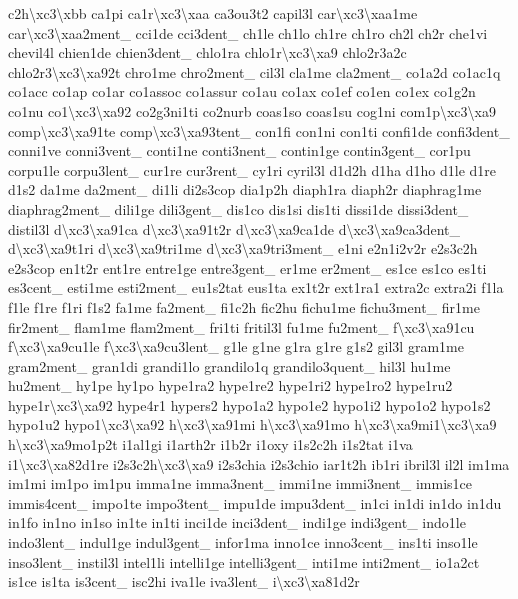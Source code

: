 \begin{DoxyCompactItemize}
c2h\textbackslash{}xc3\textbackslash{}xbb ca1pi ca1r\textbackslash{}xc3\textbackslash{}xaa ca3ou3t2 capil3l car\textbackslash{}xc3\textbackslash{}xaa1me car\textbackslash{}xc3\textbackslash{}xaa2ment\-\_\- cci1de cci3dent\-\_\- ch1le ch1lo ch1re ch1ro ch2l ch2r che1vi chevil4l chien1de chien3dent\-\_\- chlo1ra chlo1r\textbackslash{}xc3\textbackslash{}xa9 chlo2r3a2c chlo2r3\textbackslash{}xc3\textbackslash{}xa92t chro1me chro2ment\-\_\- cil3l cla1me cla2ment\-\_\- co1a2d co1ac1q co1acc co1ap co1ar co1assoc co1assur co1au co1ax co1ef co1en co1ex co1g2n co1nu co1\textbackslash{}xc3\textbackslash{}xa92 co2g3ni1ti co2nurb coas1so coas1su cog1ni com1p\textbackslash{}xc3\textbackslash{}xa9 comp\textbackslash{}xc3\textbackslash{}xa91te comp\textbackslash{}xc3\textbackslash{}xa93tent\-\_\- con1fi con1ni con1ti confi1de confi3dent\-\_\- conni1ve conni3vent\-\_\- conti1ne conti3nent\-\_\- contin1ge contin3gent\-\_\- cor1pu corpu1le corpu3lent\-\_\- cur1re cur3rent\-\_\- cy1ri cyril3l d1d2h d1ha d1ho d1le d1re d1s2 da1me da2ment\-\_\- di1li di2s3cop dia1p2h diaph1ra diaph2r diaphrag1me diaphrag2ment\-\_\- dili1ge dili3gent\-\_\- dis1co dis1si dis1ti dissi1de dissi3dent\-\_\- distil3l d\textbackslash{}xc3\textbackslash{}xa91ca d\textbackslash{}xc3\textbackslash{}xa91t2r d\textbackslash{}xc3\textbackslash{}xa9ca1de d\textbackslash{}xc3\textbackslash{}xa9ca3dent\-\_\- d\textbackslash{}xc3\textbackslash{}xa9t1ri d\textbackslash{}xc3\textbackslash{}xa9tri1me d\textbackslash{}xc3\textbackslash{}xa9tri3ment\-\_\- e1ni e2n1i2v2r e2s3c2h e2s3cop en1t2r ent1re entre1ge entre3gent\-\_\- er1me er2ment\-\_\- es1ce es1co es1ti es3cent\-\_\- esti1me esti2ment\-\_\- eu1s2tat eus1ta ex1t2r ext1ra1 extra2c extra2i f1la f1le f1re f1ri f1s2 fa1me fa2ment\-\_\- fi1c2h fic2hu fichu1me fichu3ment\-\_\- fir1me fir2ment\-\_\- flam1me flam2ment\-\_\- fri1ti fritil3l fu1me fu2ment\-\_\- f\textbackslash{}xc3\textbackslash{}xa91cu f\textbackslash{}xc3\textbackslash{}xa9cu1le f\textbackslash{}xc3\textbackslash{}xa9cu3lent\-\_\- g1le g1ne g1ra g1re g1s2 gil3l gram1me gram2ment\-\_\- gran1di grandi1lo grandilo1q grandilo3quent\-\_\- hil3l hu1me hu2ment\-\_\- hy1pe hy1po hype1ra2 hype1re2 hype1ri2 hype1ro2 hype1ru2 hype1r\textbackslash{}xc3\textbackslash{}xa92 hype4r1 hypers2 hypo1a2 hypo1e2 hypo1i2 hypo1o2 hypo1s2 hypo1u2 hypo1\textbackslash{}xc3\textbackslash{}xa92 h\textbackslash{}xc3\textbackslash{}xa91mi h\textbackslash{}xc3\textbackslash{}xa91mo h\textbackslash{}xc3\textbackslash{}xa9mi1\textbackslash{}xc3\textbackslash{}xa9 h\textbackslash{}xc3\textbackslash{}xa9mo1p2t i1al1gi i1arth2r i1b2r i1oxy i1s2c2h i1s2tat i1va i1\textbackslash{}xc3\textbackslash{}xa82d1re i2s3c2h\textbackslash{}xc3\textbackslash{}xa9 i2s3chia i2s3chio iar1t2h ib1ri ibril3l il2l im1ma im1mi im1po im1pu imma1ne imma3nent\-\_\- immi1ne immi3nent\-\_\- immis1ce immis4cent\-\_\- impo1te impo3tent\-\_\- impu1de impu3dent\-\_\- in1ci in1di in1do in1du in1fo in1no in1so in1te in1ti inci1de inci3dent\-\_\- indi1ge indi3gent\-\_\- indo1le indo3lent\-\_\- indul1ge indul3gent\-\_\- infor1ma inno1ce inno3cent\-\_\- ins1ti inso1le inso3lent\-\_\- instil3l intel1li intelli1ge intelli3gent\-\_\- inti1me inti2ment\-\_\- io1a2ct is1ce is1ta is3cent\-\_\- isc2hi iva1le iva3lent\-\_\- i\textbackslash{}xc3\textbackslash{}xa81d2r 
\end{DoxyCompactItemize}
